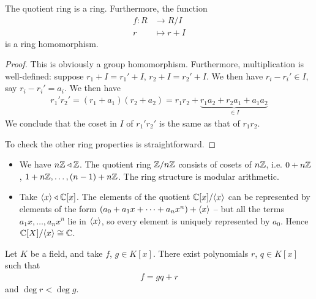 \documentclass{../template/note}
\begin{document}
    \begin{proposition}
        The quotient ring is a ring. Furthermore, the function
        \begin{align*}
            f: R &\to R/I \\
            r &\mapsto r + I
        \end{align*}
        is a ring homomorphism.
    \end{proposition}
    
    \begin{proof}
        This is obviously a group homomorphism. Furthermore, multiplication is well-defined: suppose $r_1 + I = r_1' + I$, $r_2 + I = r_2' + I$. We then have $r_i - r_i' \in I$, say $r_i - r_i' = a_i$. We then have
        \begin{align*}
            r_1'r_2' = (r_1+a_1)(r_2+a_2) = r_1r_2 + \underbrace{r_1a_2 + r_2a_1 + a_1a_2}_{\in I}
        \end{align*}
        We conclude that the coset in $I$ of $r_1'r_2'$ is the same as that of $r_1r_2$.

        To check the other ring properties is straightforward.        
    \end{proof}
    
    \begin{example}
        \begin{itemize}
            \item We have $n\mathbb Z \triangleleft \mathbb Z$. The quotient ring $\mathbb Z/n\mathbb Z$ consists of cosets of $n\mathbb Z$, i.e. $0 + n\mathbb Z$, $1 + n\mathbb Z, \dots, (n-1) + n\mathbb Z$. The ring structure is modular arithmetic.
            \item Take $\left \langle x \right \rangle \triangleleft \mathbb C[x]$. The elements of the quotient $\mathbb C[x]/\!\left \langle x \right \rangle$ can be represented by elements of the form $(a_0 + a_1x + \dots + a_nx^n) + \left \langle x \right \rangle$ -- but all the terms $a_1x, \dots, a_nx^n$ lie in $\left \langle x \right \rangle$, so every element is uniquely represented by $a_0$. Hence $\mathbb C[X]/\!\left \langle x \right \rangle \cong \mathbb C$.
        \end{itemize}
    \end{example}
    
    \begin{proposition}
        Let $K$ be a field, and take $f$, $g \in K[x]$. There exist polynomials $r$, $q \in K[x]$ such that
        \begin{align*}
            f = gq + r
        \end{align*}
        and $\deg r < \deg g$.        
    \end{proposition}
    
\end{document}
